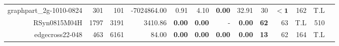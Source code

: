 \begin{landscape}
\begin{table*}[t]
\begin{tabular}{|r|r|r||r||r|r|r|r||r|r|r|r|r|}
          graphpart\_2g-1010-0824 &          301 &          101 &         -7024864.00 &           0.91 &           4.10 &  \textbf{0.00} &          32.91 &                 30 &         $\bm{< 1}$ &          162 &          T.L \\ 
                     RSyn0815M04H &         1797 &         3191 &             3410.86 &  \textbf{0.00} &  \textbf{0.00} &              - &  \textbf{0.00} &        \textbf{62} &                 63 &          T.L &          510 \\ 
                  edgecross22-048 &          463 &         6161 &               84.00 &  \textbf{0.00} &  \textbf{0.00} &  \textbf{0.00} &  \textbf{0.00} &        \textbf{13} &                 62 &          164 &          T.L \\ 
\hline 
\end{tabular}\\ 
\end{table*} 
\end{landscape} 
